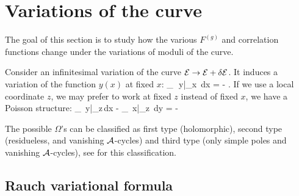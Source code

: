 
\section{Variations of the curve}
\label{sectcompstruct}

The goal of this section is to study how the various $F^{(g)}$ and correlation functions change under the variations of moduli of the curve.


Consider an infinitesimal variation of the curve ${\cal E}\to {\cal E}+\delta {\cal E}$.
It induces a variation of the function $y(x)$ at fixed $x$:
\beq
\delta_\Omega\,\, y|_x \,dx = - \Omega.
\eeq
If we use a local coordinate $z$, we may prefer to work at fixed $z$ instead of fixed $x$, we have a Poisson structure:
\beq\label{deltaydxxdy}
\delta_\Omega\, y|_z\,dx - \delta_\Omega\, x|_z\, dy = - \Omega
\eeq

The possible $\Omega$'s can be classified as first type (holomorphic), second type (residueless, and vanishing ${\cal A}$-cycles) and third type (only simple poles and vanishing ${\cal A}$-cycles), 
see \cite{Marco2} for this classification.



\subsection{Rauch variational formula}


